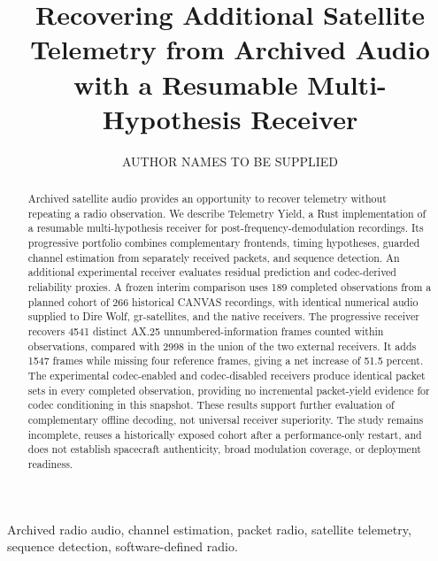 \documentclass{ieeeaccess}
\begin{document}
\title{Recovering Additional Satellite Telemetry from Archived Audio with a Resumable Multi-Hypothesis Receiver}
\author{\uppercase{Author names to be supplied}}
\address{Affiliations and author identifiers to be supplied before submission.}
\begin{abstract}
Archived satellite audio provides an opportunity to recover telemetry without repeating a radio observation. We describe Telemetry Yield, a Rust implementation of a resumable multi-hypothesis receiver for post-frequency-demodulation recordings. Its progressive portfolio combines complementary frontends, timing hypotheses, guarded channel estimation from separately received packets, and sequence detection. An additional experimental receiver evaluates residual prediction and codec-derived reliability proxies. A frozen interim comparison uses 189 completed observations from a planned cohort of 266 historical CANVAS recordings, with identical numerical audio supplied to Dire Wolf, gr-satellites, and the native receivers. The progressive receiver recovers 4541 distinct AX.25 unnumbered-information frames counted within observations, compared with 2998 in the union of the two external receivers. It adds 1547 frames while missing four reference frames, giving a net increase of 51.5 percent. The experimental codec-enabled and codec-disabled receivers produce identical packet sets in every completed observation, providing no incremental packet-yield evidence for codec conditioning in this snapshot. These results support further evaluation of complementary offline decoding, not universal receiver superiority. The study remains incomplete, reuses a historically exposed cohort after a performance-only restart, and does not establish spacecraft authenticity, broad modulation coverage, or deployment readiness.
\end{abstract}
\begin{keywords}
Archived radio audio, channel estimation, packet radio, satellite telemetry, sequence detection, software-defined radio.
\end{keywords}
\maketitle
\end{document}
